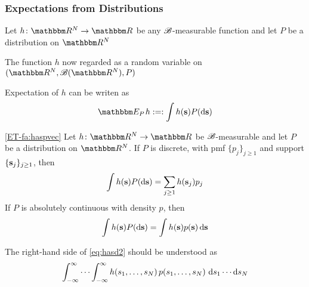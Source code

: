\begin{frame}\frametitle{Expectations from Distributions}

    \vspace{2em}
    Let $h \colon \RR^N \to \RR$ be any $\mathscr B$-measurable function and let
    $P$ be a distribution on $\RR^N$
    
    The function $h$ now regarded as a random variable on 
    $(\RR^N, \bB(\RR^N), P)$
    
    Expectation of $h$ can be writen as
    \begin{equation}
        \label{eq:eph}
        \EEP h :=: \int h(\bolds) P(\diff \bolds)
    \end{equation}
    
\end{frame}

\begin{frame}

    \vspace{2em}
    \Fact\eqref{ET-fa:haspvec}
        Let $h \colon \RR^N \to \RR$ be $\mathscr B$-measurable and let $P$ be a
        distribution on $\RR^N$.  If $P$ is discrete, with {\sc pmf} $\{p_j\}_{j
        \geq 1}$ and support $\{{\mathbf s}_j\}_{j \geq 1}$, then
        \begin{equation}
            \label{eq:hasp2}
            \int h({\mathbf s}) P(\mathop{}\!\mathrm{d} {\mathbf s}) = \sum_{j\geq 1} h({\mathbf s}_j) p_j 
        \end{equation}
        If $P$ is absolutely continuous with density $p$, then
        \begin{equation}
            \label{eq:hasd2}
            \int h({\mathbf s})P(\mathop{}\!\mathrm{d} {\mathbf s}) 
            = \int h({\mathbf s}) p({\mathbf s}) \mathop{}\!\mathrm{d} {\mathbf s}
    \end{equation}
    
    The right-hand side of \eqref{eq:hasd2} should be understood as 
    \begin{equation*}
        \int_{-\infty}^\infty
            \cdots
            \int_{-\infty}^\infty
            h(s_1, \ldots, s_N) \,
            p(s_1,\ldots,s_N)  \,
            \mathop{}\!\mathrm{d} s_1 \cdots \mathop{}\!\mathrm{d} s_N
    \end{equation*}
\end{frame}

